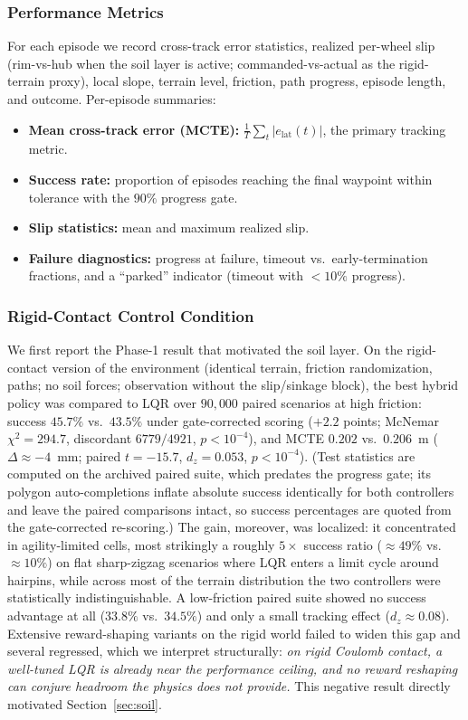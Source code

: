 \documentclass[conference]{IEEEtran}
\begin{document}
\subsubsection{Performance Metrics}
For each episode we record cross-track error statistics, realized per-wheel slip (rim-vs-hub when the soil layer is active; commanded-vs-actual as the rigid-terrain proxy), local slope, terrain level, friction, path progress, episode length, and outcome. Per-episode summaries:
\begin{itemize}
\item \textbf{Mean cross-track error (MCTE):} $\frac{1}{T}\sum_t |e_{\text{lat}}(t)|$, the primary tracking metric.
\item \textbf{Success rate:} proportion of episodes reaching the final waypoint within tolerance with the $90\%$ progress gate.
\item \textbf{Slip statistics:} mean and maximum realized slip.
\item \textbf{Failure diagnostics:} progress at failure, timeout vs.\ early-termination fractions, and a ``parked'' indicator (timeout with $<10\%$ progress).
\end{itemize}

\subsubsection{Rigid-Contact Control Condition}
\label{sec:rigidresults}
We first report the Phase-1 result that motivated the soil layer. On the rigid-contact version of the environment (identical terrain, friction randomization, paths; no soil forces; observation without the slip/sinkage block), the best hybrid policy was compared to LQR over $90{,}000$ paired scenarios at high friction: success $45.7\%$ vs.\ $43.5\%$ under gate-corrected scoring ($+2.2$ points; McNemar $\chi^2 = 294.7$, discordant $6779/4921$, $p < 10^{-4}$), and MCTE $0.202$ vs.\ $0.206$~m ($\Delta \approx -4$~mm; paired $t = -15.7$, $d_z = 0.053$, $p < 10^{-4}$). (Test statistics are computed on the archived paired suite, which predates the progress gate; its polygon auto-completions inflate absolute success identically for both controllers and leave the paired comparisons intact, so success percentages are quoted from the gate-corrected re-scoring.) The gain, moreover, was localized: it concentrated in agility-limited cells, most strikingly a roughly $5\times$ success ratio ($\approx\!49\%$ vs.\ $\approx\!10\%$) on flat sharp-zigzag scenarios where LQR enters a limit cycle around hairpins, while across most of the terrain distribution the two controllers were statistically indistinguishable. A low-friction paired suite showed no success advantage at all ($33.8\%$ vs.\ $34.5\%$) and only a small tracking effect ($d_z \approx 0.08$). Extensive reward-shaping variants on the rigid world failed to widen this gap and several regressed, which we interpret structurally: \emph{on rigid Coulomb contact, a well-tuned LQR is already near the performance ceiling, and no reward reshaping can conjure headroom the physics does not provide.} This negative result directly motivated Section~\ref{sec:soil}.
\end{document}
